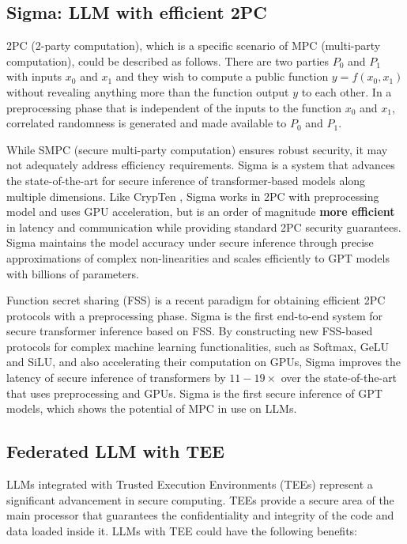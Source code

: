 \documentclass[lang=en]{sjtuarticle}
\begin{document}
\subsection{Sigma: LLM with efficient 2PC}\label{sec:mpc}

2PC (2-party computation), which is a specific scenario of MPC (multi-party computation), could be described as follows. There
are two parties $P_0$ and $P_1$ with inputs $x_0$ and $x_1$ and they wish to
compute a public function $y=f(x_0,x_1)$ without revealing anything
more than the function output $y$ to each other. In a preprocessing
phase that is independent of the inputs to the function $x_0$ and $x_1$,
correlated randomness is generated and made available to $P_0$ and
$P_1$.

While SMPC (secure multi-party computation) ensures robust security, it may not
adequately address efficiency requirements. Sigma \cite{cryptoeprint:2023/1269} is a system that advances the
state-of-the-art for secure inference of transformer-based models
along multiple dimensions. Like CrypTen \cite{NEURIPS2021_27545182}, Sigma works in 2PC with
preprocessing model and uses GPU acceleration, but is an order
of magnitude \textbf{more efficient} in latency and communication while
providing standard 2PC security guarantees. Sigma maintains the model accuracy under secure inference through precise approximations of complex non-linearities and scales efficiently to GPT
models with billions of parameters.

Function secret sharing (FSS) \cite{boyle2016function} is a
recent paradigm for obtaining efficient 2PC protocols with a preprocessing phase. Sigma is the first end-to-end system
for secure transformer inference based on FSS. By constructing
new FSS-based protocols for complex machine learning functionalities, such as Softmax, GeLU and SiLU, and also accelerating their
computation on GPUs, Sigma improves the latency of secure inference of transformers by $11-19\times$ over the state-of-the-art that
uses preprocessing and GPUs. Sigma is the first secure inference
of GPT models, which shows the potential of MPC in use on LLMs.

\subsection{Federated LLM with TEE}\label{sec:tee}

LLMs integrated with Trusted Execution Environments (TEEs) represent a significant advancement in secure computing. TEEs provide a secure area of the main processor that guarantees the confidentiality and integrity of the code and data loaded inside it. LLMs with TEE could have the following benefits:
\end{document}
